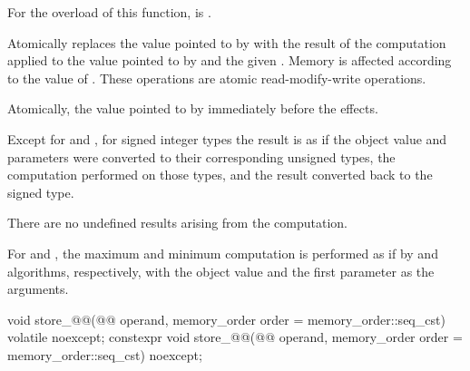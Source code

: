 \begin{itemdescr}
\pnum
\constraints
For the  overload of this function,
 is .

\pnum
\effects
Atomically replaces the value pointed to by
 with the result of the computation applied to the
value pointed to by  and the given .
Memory is affected according to the value of .
These operations are atomic read-modify-write operations.

\pnum
\returns
Atomically, the value pointed to by  immediately before the effects.

\pnum
{}%
\remarks
Except for  and , for signed integer types
the result is as if the object value and parameters
were converted to their corresponding unsigned types,
the computation performed on those types, and
the result converted back to the signed type.
\begin{note}
There are no undefined results arising from the computation.
\end{note}

\pnum
For  and , the maximum and minimum
computation is performed as if by  and 
algorithms, respectively,
with the object value and the first parameter as the arguments.
\end{itemdescr}

%
%
%
%
%
%
%
%
%
%
%
%
%
%
%
%
%
%
\begin{itemdecl}
void store_@@(@@ operand,
                memory_order order = memory_order::seq_cst) volatile noexcept;
constexpr void store_@@(@@ operand,
                          memory_order order = memory_order::seq_cst) noexcept;
\end{itemdecl}

